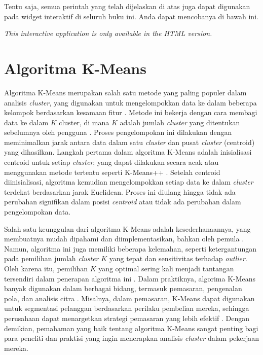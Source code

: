 \documentclass[
  oneside]{book}
\begin{document}
Tentu saja, semua perintah yang telah dijelaskan di atas juga dapat digunakan pada widget interaktif di seluruh buku ini. Anda dapat mencobanya di bawah ini.

\begin{center}
\textit{This interactive application is only available in the HTML version.}
\end{center}

\chapter{Algoritma K-Means}\label{km}

Algoritma K-Means merupakan salah satu metode yang paling populer dalam analisis \emph{cluster}, yang digunakan untuk mengelompokkan data ke dalam beberapa kelompok berdasarkan kesamaan fitur \citep{jain2010} . Metode ini bekerja dengan cara membagi data ke dalam \(K\) cluster, di mana \(K\) adalah jumlah \emph{cluster} yang ditentukan sebelumnya oleh pengguna \citep{macqueen1967some}. Proses pengelompokan ini dilakukan dengan meminimalkan jarak antara data dalam satu \emph{cluster} dan pusat \emph{cluster} (centroid) yang dihasilkan. Langkah pertama dalam algoritma K-Means adalah inisialisasi centroid untuk setiap \emph{cluster}, yang dapat dilakukan secara acak atau menggunakan metode tertentu seperti K-Means++ \citep{arthur2007kmeans}. Setelah centroid diinisialisasi, algoritma kemudian mengelompokkan setiap data ke dalam \emph{cluster} terdekat berdasarkan jarak Euclidean\citep{hastie2009elements}. Proses ini diulang hingga tidak ada perubahan signifikan dalam posisi \emph{centroid} atau tidak ada perubahan dalam pengelompokan data.

Salah satu keunggulan dari algoritma K-Means adalah kesederhanaannya, yang membuatnya mudah dipahami dan diimplementasikan, bahkan oleh pemula \citep{han2011data}. Namun, algoritma ini juga memiliki beberapa kelemahan, seperti ketergantungan pada pemilihan jumlah \emph{cluster} \(K\) yang tepat dan sensitivitas terhadap \emph{outlier}. Oleh karena itu, pemilihan \(K\) yang optimal sering kali menjadi tantangan tersendiri dalam penerapan algoritma ini \citep{elbow1975outline}. Dalam praktiknya, algorima K-Means banyak digunakan dalam berbagai bidang, termasuk pemasaran, pengenalan pola, dan analisis citra \citep{xu2005survey}. Misalnya, dalam pemasaran, K-Means dapat digunakan untuk segmentasi pelanggan berdasarkan perilaku pembelian mereka, sehingga perusahaan dapat menargetkan strategi pemasaran yang lebih efektif \citep{kumar2016creating}. Dengan demikian, pemahaman yang baik tentang algoritma K-Means sangat penting bagi para peneliti dan praktisi yang ingin menerapkan analisis \emph{cluster} dalam pekerjaan mereka.
\end{document}
